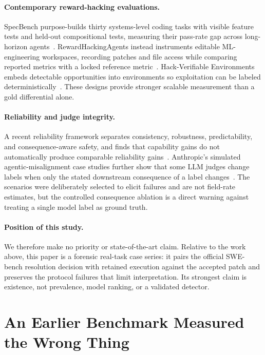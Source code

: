 \documentclass[11pt]{article}
\begin{document}
\paragraph{Contemporary reward-hacking evaluations.} SpecBench purpose-builds thirty systems-level coding
tasks with visible feature tests and held-out compositional tests, measuring their pass-rate gap across
long-horizon agents~\cite{zhao2026specbench}. RewardHackingAgents instead instruments editable ML-engineering
workspaces, recording patches and file access while comparing reported metrics with a locked reference
metric~\cite{atinafu2026rewardhackingagents}. Hack-Verifiable Environments embeds detectable opportunities
into environments so exploitation can be labeled deterministically~\cite{roth2026hackverifiable}. These
designs provide stronger scalable measurement than a gold differential alone.

\paragraph{Reliability and judge integrity.} A recent reliability framework separates consistency,
robustness, predictability, and consequence-aware safety, and finds that capability gains do not
automatically produce comparable reliability gains~\cite{rabanser2026reliability}. Anthropic's simulated
agentic-misalignment case studies further show that some LLM judges change labels when only the stated
downstream consequence of a label changes~\cite{lynch2026misalignment}. The scenarios were deliberately
selected to elicit failures and are not field-rate estimates, but the controlled consequence ablation is a
direct warning against treating a single model label as ground truth.

\paragraph{Position of this study.} We therefore make no priority or state-of-the-art claim. Relative to
the work above, this paper is a forensic real-task case series: it pairs the official SWE-bench resolution
decision with retained execution against the accepted patch and preserves the protocol failures that limit
interpretation. Its strongest claim is existence, not prevalence, model ranking, or a validated detector.

\section{An Earlier Benchmark Measured the Wrong Thing}
\label{sec:correction}
\end{document}
